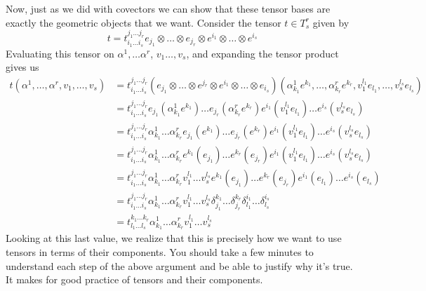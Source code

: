 \documentclass[a4paper]{article}
\begin{document}
Now, just as we did with covectors we can show that these tensor bases are exactly the geometric objects that we want. Consider the tensor $t \in T^r_s$ given by
\[
  t = t^{j_1 \dots j_r}_{i_1 \dots i_s} e_{j_1} \otimes \dots \otimes e_{j_r} \otimes e^{i_1} \otimes \dots \otimes e^{i_s}
\]
Evaluating this tensor on $\alpha^1, \dots \alpha^r$, $v_1 \dots, v_s$, and expanding the tensor product gives us
\[
  \begin{aligned}
    t(\alpha^1, \dots, \alpha^r, v_1, \dots, v_s) &= t^{j_1 \dots j_r}_{i_1 \dots i_s} (e_{j_1} \otimes \dots \otimes e^{j_r} \otimes e^{i_1} \otimes \dots \otimes e_{i_s}) (\alpha^1_{k_1}e^{k_1}, \dots, \alpha^r_{k_r}e^{k_r}, v_1^{l_1} e_{l_1}, \dots, v_s^{l_s}e_{l_s})\\
                                                  &= t^{j_1 \dots j_r}_{i_1 \dots i_s} e_{j_1}(\alpha^1_{k_1}e^{k_1}) \dots e_{j_r}(\alpha^r_{k_r}e^{k_r}) e^{i_1} ( v_1^{l_1}e_{l_1} )  \dots e^{i_s}(v_s^{l_s} e_{l_s}) \\
                                                  &= t^{j_1 \dots j_r}_{i_1 \dots i_s} \alpha^1_{k_1} \dots \alpha^r_{k_r} e_{j_1}(e^{k_1}) \dots e_{j_r}(e^{k_r}) e^{i_1} ( v_1^{l_1}e_{l_1} )  \dots e^{i_s}(v_s^{l_s} e_{l_s}) \\
                                                  &= t^{j_1 \dots j_r}_{i_1 \dots i_s} \alpha^1_{k_1} \dots \alpha^r_{k_r} e^{k_1}(e_{j_1}) \dots e^{k_r}(e_{j_r}) e^{i_1} ( v_1^{l_1}e_{l_1} )  \dots e^{i_s}(v_s^{l_s} e_{l_s}) \\
                                                  &= t^{j_1 \dots j_r}_{i_1 \dots i_s} \alpha^1_{k_1} \dots \alpha^r_{k_r}v_1^{l_1} \dots v_s^{l_s} e^{k_1}(e_{j_1}) \dots e^{k_r}(e_{j_r}) e^{i_1} (e_{l_1} )  \dots e^{i_s}(e_{l_s}) \\
                                                  &= t^{j_1 \dots j_r}_{i_1 \dots i_s} \alpha^1_{k_1} \dots \alpha^r_{k_r}v_1^{l_1} \dots v_s^{l_s}  \delta_{j_1}^{k_1} \dots \delta_{j_r}^{k_r} \delta_{l_1}^{i_1} \dots \delta_{l_s}^{i_s} \\
                                                  &= t^{k_1 \dots k_r}_{l_1 \dots l_s} \alpha^1_{k_1} \dots \alpha^r_{k_r}v_1^{l_1} \dots v_s^{l_s}
  \end{aligned}
\]
Looking at this last value, we realize that this is precisely how we want to use tensors in terms of their components. You should take a few minutes to understand each step of the above argument and be able to justify why it's true. It makes for good practice of tensors and their components.
\end{document}

